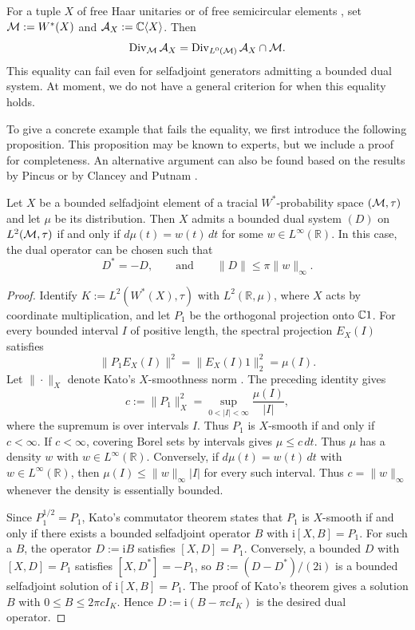 For a tuple $X$ of free Haar unitaries \cite[Theorem~1.1]{Lin00} or of free semicircular elements \cite[Theorem~4.5]{Miy22}, set $\mathcal M:=W^*(X)$ and $\mathcal A_X:=\mathbb C\langle X\rangle$.
Then
\[
 \operatorname{Div}_{\mathcal M}\mathcal A_X
 =\operatorname{Div}_{L^0(\mathcal M)}\mathcal A_X\cap\mathcal M.
\]
This equality can fail even for selfadjoint generators admitting a bounded dual system.
At moment, we do not have a general criterion for when this equality holds.

To give a concrete example that fails the equality, we first introduce the following proposition.
This proposition may be known to experts, but we include a proof for completeness.
An alternative argument can also be found based on the results by Pincus \cite[Theorem~2.1 and p.~226]{Pin68} or by Clancey and Putnam \cite[p.~452]{CP71}.

\begin{proposition}\label{prop:scalar-bounded-dual}
Let $X$ be a bounded selfadjoint element of a tracial $W^*$-probability space $(\mathcal M,\tau)$ and let $\mu$ be its distribution.
Then $X$ admits a bounded dual system $(D)$ on $L^2(\mathcal M,\tau)$ if and only if $d\mu(t)=w(t)\,dt$ for some $w\in L^\infty(\mathbb R)$.
In this case, the dual operator can be chosen such that
\[D^*=-D,\qquad\text{and}\qquad\|D\|\leq\pi\|w\|_\infty.\]
\end{proposition}

\begin{proof}
Identify $K:=L^2(W^*(X),\tau)$ with $L^2(\mathbb R,\mu)$, where $X$ acts by coordinate multiplication, and let $P_1$ be the orthogonal projection onto $\mathbb C1$.
For every bounded interval $I$ of positive length, the spectral projection $E_X(I)$ satisfies
\[
 \|P_1 E_X(I)\|^2=\|E_X(I)1\|_2^2=\mu(I).
\]
Let $\|\cdot\|_X$ denote Kato's $X$-smoothness norm \cite[(2.2), p.~536]{Kat68}.
The preceding identity gives
\[
 c:=\|P_1\|_X^2=\sup_{0<|I|<\infty}\frac{\mu(I)}{|I|},
\]
where the supremum is over intervals $I$.
Thus $P_1$ is $X$-smooth if and only if $c<\infty$.
If $c<\infty$, covering Borel sets by intervals gives $\mu\leq c\,dt$.
Thus $\mu$ has a density $w$ with $w\in L^\infty(\mathbb R)$.
Conversely, if $d\mu(t)=w(t)\,dt$ with $w\in L^\infty(\mathbb R)$, then $\mu(I)\leq\|w\|_\infty |I|$ for every such interval.
Thus $c=\|w\|_\infty$ whenever the density is essentially bounded.

Since $P_1^{1/2}=P_1$, Kato's commutator theorem \cite[Theorem~(6.2), p.~543]{Kat68} states that $P_1$ is $X$-smooth if and only if there exists a bounded selfadjoint operator $B$ with $\mathrm i[X,B]=P_1$.
For such a $B$, the operator $D:=\mathrm iB$ satisfies $[X,D]=P_1$.
Conversely, a bounded $D$ with $[X,D]=P_1$ satisfies $[X,D^*]=-P_1$, so $B:=(D-D^*)/(2\mathrm i)$ is a bounded selfadjoint solution of $\mathrm i[X,B]=P_1$.
The proof of Kato's theorem \cite[p.~545]{Kat68} gives a solution $B$ with $0\leq B\leq 2\pi c I_K$.
Hence $D:=\mathrm i(B-\pi c I_K)$ is the desired dual operator.
\end{proof}

